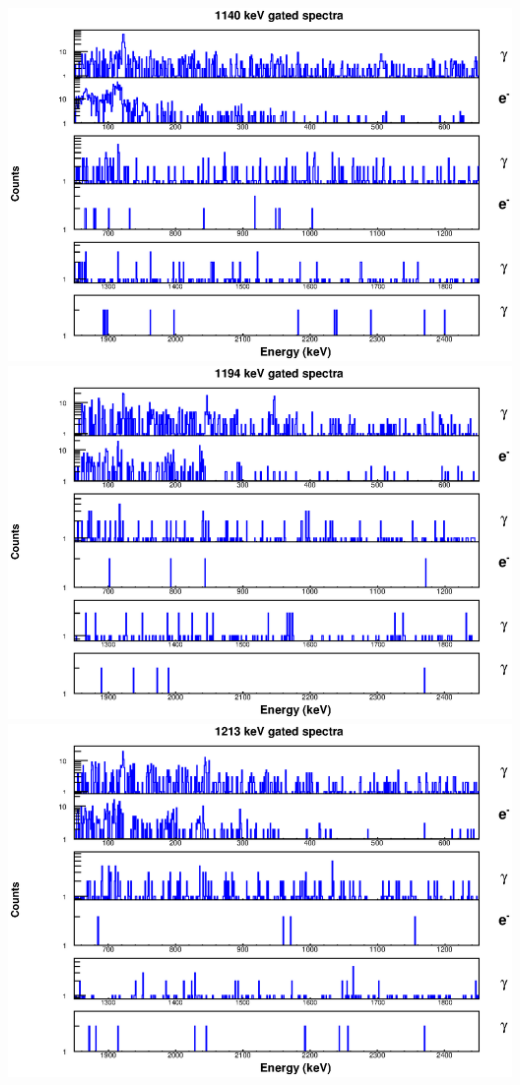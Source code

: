 \begin{landscape}
\includegraphics[scale=1.1]{154Gd_Appendix/1140_combined.eps}
\includegraphics[scale=1.1]{154Gd_Appendix/1194_combined.eps}
\includegraphics[scale=1.1]{154Gd_Appendix/1213_combined.eps}

\end{landscape}
